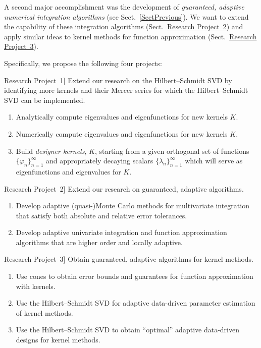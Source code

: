 \documentclass[11pt]{NSFamsart}
\newcommand{\refproba}{\hyperref[SectHSSVD]{Research Project~1}\xspace}
\newcommand{\refprobb}{\hyperref[SectGAIL]{Research Project~2}\xspace}
\newcommand{\refprobc}{\hyperref[combinesec]{Research Project~3}\xspace}
\begin{document}
A second major accomplishment was the development of \emph{guaranteed, adaptive numerical integration algorithms} \citep{HicEtal14b,HicJim16a,HicEtal14a,JimHic16a} (see Sect.~\ref{SectPrevious}).  We want to extend the capability of these integration algorithms  (Sect.\ \refprobb) and apply similar ideas to kernel methods for function approximation (Sect.\ \refprobc).

Specifically, we propose the following four projects:

\begin{description}[leftmargin=2.5ex]

\item[\refproba] Extend our research on the Hilbert--Schmidt SVD by identifying more kernels and their Mercer series for which the Hilbert--Schmidt SVD can be implemented.
\begin{enumerate}
\renewcommand{\labelenumi}{1.\arabic{enumi}.}
\item Analytically compute eigenvalues and eigenfunctions for new kernels $K$.
\item Numerically compute eigenvalues and eigenfunctions for new kernels $K$.
\item Build \emph{designer kernels}, $K$, starting from a given orthogonal set of functions $\{\varphi_n\}_{n=1}^\infty$ and appropriately decaying scalars $\{\lambda_n\}_{n=1}^\infty$ which will serve as eigenfunctions and eigenvalues for $K$.
\end{enumerate}

\item[\refprobb] Extend our research on guaranteed, adaptive algorithms.
\begin{enumerate}
\renewcommand{\labelenumi}{2.\arabic{enumi}.}
\item Develop adaptive (quasi-)Monte Carlo methods for multivariate integration that satisfy both absolute and relative error tolerances.
\item Develop adaptive univariate integration and function approximation algorithms that are higher order and locally adaptive.
\end{enumerate}

\item[\refprobc] Obtain guaranteed, adaptive algorithms for kernel methods.
\begin{enumerate}
\renewcommand{\labelenumi}{3.\arabic{enumi}.}
\item Use cones to obtain error bounds and guarantees for function approximation with kernels.
\item Use the Hilbert--Schmidt SVD for adaptive data-driven parameter estimation of kernel methods.
\item Use the Hilbert--Schmidt SVD to obtain ``optimal'' adaptive data-driven designs for kernel methods.
\end{enumerate}


\end{description}
\end{document}
